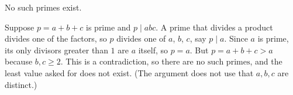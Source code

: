 No such primes exist.

Suppose $p=a+b+c$ is prime and $p\mid abc$. A prime that divides a product divides one of the factors, so $p$ divides one of $a$, $b$, $c$, say $p\mid a$. Since $a$ is prime, its only divisors greater than $1$ are $a$ itself, so $p=a$. But $p=a+b+c>a$ because $b,c\ge2$. This is a contradiction, so there are $\boxed{\text{no such primes}}$, and the least value asked for does not exist. (The argument does not use that $a,b,c$ are distinct.)
